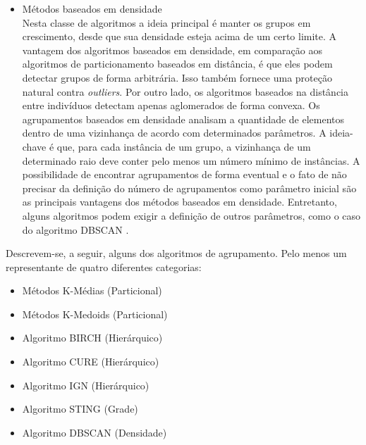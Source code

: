 \begin{itemize}
	\item Métodos baseados em densidade\\
    	Nesta classe de algoritmos a ideia principal é manter os grupos em crescimento, desde que sua densidade esteja acima de um certo limite. A vantagem dos algoritmos baseados em densidade, em comparação aos algoritmos de particionamento baseados em distância, é que eles podem detectar grupos de forma arbitrária. Isso também fornece uma proteção natural contra \textit{outliers}. Por outro lado, os algoritmos baseados na distância entre indivíduos detectam apenas aglomerados de forma convexa.
        Os agrupamentos baseados em densidade analisam a quantidade de elementos dentro de uma vizinhança de acordo com determinados parâmetros. A ideia-chave é que, para cada instância de um grupo, a vizinhança de um determinado raio deve conter pelo menos um número mínimo de instâncias.
        A possibilidade de encontrar agrupamentos de forma eventual e o fato de não precisar da definição do número de agrupamentos \cite{yip2005} como parâmetro inicial são as principais vantagens dos métodos baseados em densidade. Entretanto, alguns algoritmos podem exigir a definição de outros parâmetros, como o caso do algoritmo \acrshort{DBSCAN} \cite{ESTER1996}.
\end{itemize}

Descrevem-se, a seguir, alguns dos algoritmos de agrupamento. Pelo menos um representante de quatro diferentes categorias:
\begin{itemize}
  \item Métodos K-Médias (Particional)
  \item Métodos K-Medoids (Particional)
  \item Algoritmo BIRCH (Hierárquico)
  \item Algoritmo CURE (Hierárquico)
  \item Algoritmo IGN (Hierárquico)
  \item Algoritmo STING (Grade)
  \item Algoritmo DBSCAN (Densidade)
\end{itemize}

